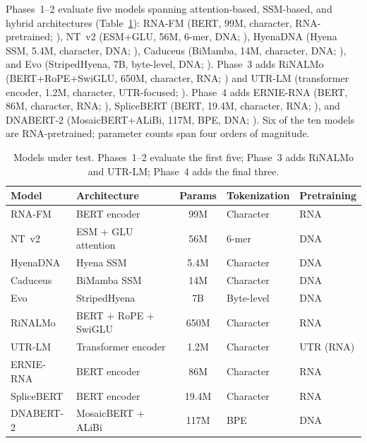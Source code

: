 \documentclass[11pt]{article}
\begin{document}
Phases~1--2 evaluate five models spanning attention-based, SSM-based,
and hybrid architectures (Table~\ref{tab:models}): RNA-FM (BERT, 99M,
character, RNA-pretrained; \citealp{rnafm}), NT~v2 (ESM+GLU, 56M,
6-mer, DNA; \citealp{dalla2023nucleotide}), HyenaDNA (Hyena SSM,
5.4M, character, DNA; \citealp{nguyen2024hyenadna}), Caduceus
(BiMamba, 14M, character, DNA; \citealp{schiff2024caduceus}), and Evo
(StripedHyena, 7B, byte-level, DNA; \citealp{nguyen2024evo}).
Phase~3 adds RiNALMo (BERT+RoPE+SwiGLU, 650M, character, RNA;
\citealp{penic2024rinalmo}) and UTR-LM (transformer encoder, 1.2M,
character, UTR-focused; \citealp{chu2024utrlm}).
Phase~4 adds ERNIE-RNA (BERT, 86M, character, RNA;
\citealp{wang2024ernierna}), SpliceBERT (BERT, 19.4M, character, RNA;
\citealp{chen2024splicebert}), and DNABERT-2 (MosaicBERT+ALiBi, 117M,
BPE, DNA; \citealp{zhou2024dnabert2}).  Six of the ten models are
RNA-pretrained; parameter counts span four orders of magnitude.

\begin{table}[t]
\centering
\caption{Models under test.  Phases~1--2 evaluate the first five;
  Phase~3 adds RiNALMo and UTR-LM; Phase~4 adds the final three.}
\label{tab:models}
\small
\begin{tabular}{@{}llcll@{}}
\toprule
\textbf{Model} & \textbf{Architecture} & \textbf{Params} &
  \textbf{Tokenization} & \textbf{Pretraining} \\
\midrule
RNA-FM     & BERT encoder          & 99M  & Character  & RNA \\
NT~v2      & ESM + GLU attention   & 56M  & 6-mer      & DNA \\
HyenaDNA   & Hyena SSM             & 5.4M & Character  & DNA \\
Caduceus   & BiMamba SSM           & 14M  & Character  & DNA \\
Evo        & StripedHyena          & 7B   & Byte-level & DNA \\
\midrule
RiNALMo    & BERT + RoPE + SwiGLU  & 650M & Character  & RNA \\
UTR-LM     & Transformer encoder   & 1.2M & Character  & UTR (RNA) \\
\midrule
ERNIE-RNA  & BERT encoder          & 86M  & Character  & RNA \\
SpliceBERT & BERT encoder          & 19.4M & Character & RNA \\
DNABERT-2  & MosaicBERT + ALiBi    & 117M & BPE        & DNA \\
\bottomrule
\end{tabular}
\end{table}
\end{document}
